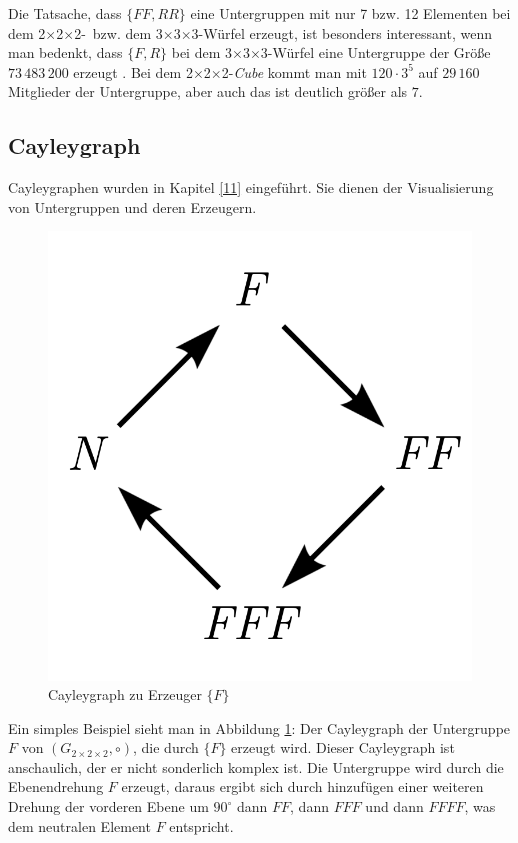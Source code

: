 \documentclass[12pt,a4paper, usenames, dvipsnames]{article}
\theoremstyle{mystyle}
\theoremstyle{definition}
\newcommand{\Gtwo}{\ensuremath{G_{2\times 2\times 2}}}
\newcommand{\Ttwo}{2$\times$2$\times$2-}
\newcommand{\Tthree}{3$\times$3$\times$3-}
\begin{document}
Die Tatsache, dass $\{ FF, RR \}$ eine Untergruppen mit nur 7 bzw. 12 Elementen bei dem \Ttwo \  bzw. dem \Tthree Würfel erzeugt, ist besonders interessant, wenn man bedenkt, dass $\{ F, R \}$ bei dem  \Tthree Würfel eine Untergruppe der Größe $73\, 483\, 200$ erzeugt \cite{TD}. 
Bei dem \Ttwo \textit{Cube} kommt man mit $120 \cdot 3^5$ auf $29 \, 160$ Mitglieder der Untergruppe, aber auch das ist deutlich größer als $7$.

%
%
%
%
%
%
%
%
%
%
%
%
%
%
%
%
\subsection*{Cayleygraph}
Cayleygraphen wurden in Kapitel \ref{11} eingeführt. Sie dienen der Visualisierung von Untergruppen und deren Erzeugern.

\begin{figure}[H]
\centering
\includegraphics[scale=0.7]{Cayleygraph1.png}
\caption{Cayleygraph zu Erzeuger $\{ F \}$}
\label{27}
\end{figure}

Ein simples Beispiel sieht man in Abbildung \ref{27}: Der Cayleygraph der Untergruppe $F$ von $(\Gtwo, \circ)$, die durch $\{ F \}$  erzeugt wird.
Dieser Cayleygraph ist anschaulich, der er nicht sonderlich komplex ist.
Die Untergruppe wird durch die Ebenendrehung $F$ erzeugt, daraus ergibt sich durch hinzufügen einer weiteren Drehung der vorderen Ebene um $90^\circ$ dann $FF$, dann $FFF$ und dann $FFFF$, was dem neutralen Element $F$ entspricht.
\end{document}
